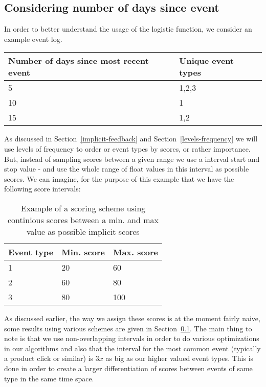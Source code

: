 \subsection{Considering number of days since event}

In order to better understand the usage of the logistic function, we consider
an example event log.

\begin{table}[H]
  \centering
  \label{events-example}
  \begin{tabular}{p{4cm}m{3cm}}
    \toprule
    Number of days since most recent event & Unique event types \\
    \midrule
    5 & 1,2,3 \\
    10 & 1 \\
    15 & 1,2 \\
    \bottomrule
  \end{tabular}
\end{table}

As discussed in Section~\ref{implicit-feedback} and
Section~\ref{levels-frequency} we will use levels of frequency to order or
event types by scores, or rather importance. But, instead of sampling scores
between a given range we use a interval start and stop value - and use the
whole range of float values in this interval as possible scores. We can
imagine, for the purpose of this example that we have the following score
intervals:

\begin{table}[H]
  \centering
  \label{implicit-example-scores}
  \begin{tabular}{lll}
    \toprule
    Event type & Min. score & Max. score \\
    \midrule
    1 & 20 & 60 \\
    2 & 60 & 80 \\
    3 & 80 & 100 \\
    \bottomrule
  \end{tabular}
  \caption{Example of a scoring scheme using continious scores between a min.
  and max value as possible implicit scores}
\end{table}

As discussed earlier, the way we assign these scores is at the moment fairly
naive, some results using various schemes are given in Section~\ref{}. The main
thing to note is that we use non-overlapping intervals in order to do various
optimizations in our algorithms and also that the interval for the most common
event (typically a product click or similar) is $3x$ as big as our higher
valued event types. This is done in order to create a larger differentiation
of scores between events of same type in the same time space.

